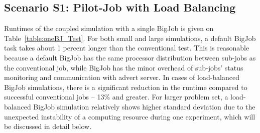 \documentclass[conference,final]{IEEEtran}
\newcommand{\jhanote}[1]{ {\textcolor{red} { ***Jha: #1 }}}
\newcommand{\jhanote}[1]{}
\begin{document}
\subsection{Scenario S1: Pilot-Job with Load Balancing}


Runtimes of the coupled simulation with a single BigJob is given on
Table~\ref{table:oneBJ_Test}. For both small and large simulations, a
default BigJob task takes about 1 percent longer than the conventional
test. This is reasonable because a default BigJob has the same
processor distribution between sub-jobs as the conventional job, while
BigJob has the minor overhead of sub-jobs' status monitoring and
communication with advert server. In cases of load-balanced BigJob
simulations, there is a significant reduction in the runtime compared
to successful conventional jobs -- 13\% and greater. For larger
problem set, a load-balanced BigJob simulation relatively shows higher
standard deviation due to the unexpected instability of a computing
resource during one experiment, which will be discussed in detail
below.
\end{document}
